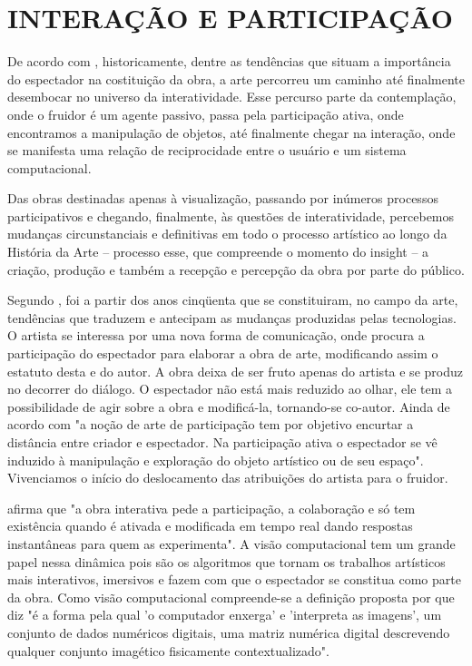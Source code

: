 \chapter{INTERAÇÃO E PARTICIPAÇÃO}

De acordo com , historicamente, dentre as tendências que situam a importância do espectador na costituição da obra, a arte percorreu um caminho até finalmente desembocar no universo da interatividade. Esse percurso parte da contemplação, onde o fruidor é um agente passivo, passa pela participação ativa, onde encontramos a manipulação de objetos, até finalmente chegar na interação, onde se manifesta uma relação de reciprocidade entre o usuário e um sistema computacional. 

Das obras destinadas apenas à visualização, passando por inúmeros processos participativos e chegando, finalmente, às questões de interatividade, percebemos mudanças circunstanciais e definitivas em todo o processo artístico ao longo da História da Arte – processo esse, que compreende o momento do insight – a criação, produção e também a recepção e percepção da obra por parte do público. \cite{vares} 

Segundo , foi a partir dos anos cinqüenta que se constituiram, no campo da arte, tendências que traduzem e antecipam as mudanças produzidas pelas tecnologias. O artista se interessa por uma nova forma de comunicação, onde procura a participação do espectador para elaborar a obra de arte, modificando assim o estatuto desta e do autor. A obra deixa de ser fruto apenas do artista e se produz no decorrer do diálogo. O espectador não está mais reduzido ao olhar, ele tem a possibilidade de agir sobre a obra e modificá-la, tornando-se co-autor. Ainda de acordo com  "a noção de arte de participação tem por objetivo encurtar a distância entre criador e espectador. Na participação ativa o espectador se vê induzido à manipulação e exploração do objeto artístico ou de seu espaço". Vivenciamos o início do deslocamento das atribuições do artista para o fruidor. 

 afirma que "a obra interativa pede a participação, a colaboração e só tem existência quando é ativada e modificada em tempo real dando respostas instantâneas para quem as experimenta". A visão computacional tem um grande papel nessa dinâmica pois são os algoritmos que tornam os trabalhos artísticos mais interativos, imersivos e fazem com que o espectador se constitua como parte da obra. Como visão computacional compreende-se a definição proposta por  que diz "é a forma pela qual 'o computador enxerga' e 'interpreta as imagens', um conjunto de dados numéricos digitais, uma matriz numérica digital descrevendo qualquer conjunto imagético fisicamente contextualizado".

